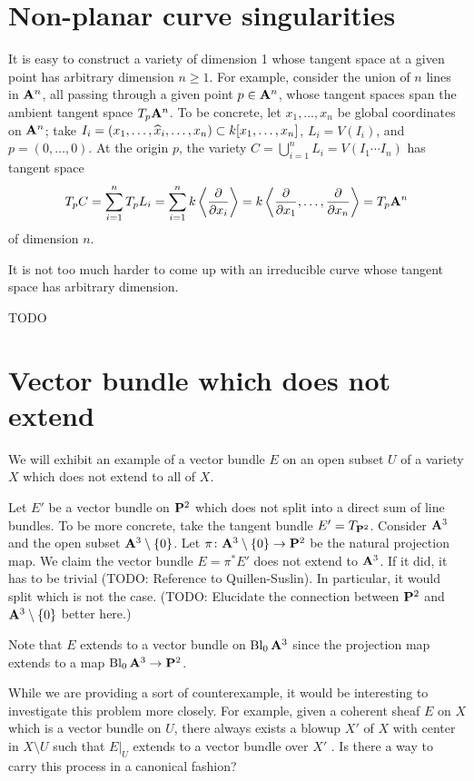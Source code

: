 \section{Non-planar curve singularities}

It is easy to construct a variety of dimension 1 whose tangent space at a given point has arbitrary dimension $n \geq 1$. For example, consider the union of $n$ lines in $\mathbf{A}^n$, all passing through a given point $p \in \mathbf{A}^n$, whose tangent spaces span the ambient tangent space $T_p \mathbf{A}^n$. To be concrete, let $x_1, \dots, x_n$ be global coordinates on $\mathbf{A}^n$; take $I_i = (x_1, \dots, \widehat{x}_i, \dots, x_n) \subset k[x_1, \dots, x_n]$, $L_i = V(I_i)$, and $p = (0, \dots, 0)$. At the origin $p$, the variety $C = \bigcup_{i=1}^n L_i = V(I_1 \cdots I_n)$ has tangent space
\[
T_p C =
\sum_{i=1}^n T_p L_i =
\sum_{i=1}^n k \left\langle \frac{\partial}{\partial x_i} \right\rangle =
k \left\langle \frac{\partial}{\partial x_1}, \dots, \frac{\partial}{\partial x_n} \right\rangle =
T_p \mathbf{A}^n
\]
of dimension $n$.

It is not too much harder to come up with an irreducible curve whose tangent space has arbitrary dimension.

TODO


\section{Vector bundle which does not extend}

We will exhibit an example of a vector bundle $E$ on an open subset $U$ of a variety $X$ which does not extend to all of $X$.

Let $E'$ be a vector bundle on $\mathbf{P}^2$ which does not split into a direct sum of line bundles. To be more concrete, take the tangent bundle $E' = T_{\mathbf{P}^2}$. Consider $\mathbf{A}^3$ and the open subset $\mathbf{A}^3 \setminus \{0\}$. Let $\pi \cn \Abb^3 \setminus \{0\} \rarr \Pbb^2$ be the natural projection map. We claim the vector bundle $E = \pi^\ast E'$ does not extend to $\mathbf{A}^3$. If it did, it has to be trivial (TODO: Reference to Quillen-Suslin). In particular, it would split which is not the case. (TODO: Elucidate the connection between $\mathbf{P}^2$ and $\mathbf{A}^3 \setminus \{0\}$ better here.)

Note that $E$ extends to a vector bundle on $\operatorname{Bl}_{0} \mathbf{A}^3$ since the projection map extends to a map $\Bl_0 \Abb^3 \rarr \Pbb^2$.

\begin{remark}
  While we are providing a sort of counterexample, it would be interesting to investigate this problem more closely. For example, given a coherent sheaf $E$ on $X$ which is a vector bundle on $U$, there always exists a blowup $X'$ of $X$ with center in $X \setminus U$ such that $E|_U$ extends to a vector bundle over $X'$ \cite[Theorem 4.1]{Raynaud-Flat-modules}. Is there a way to carry this process in a canonical fashion?
\end{remark}


